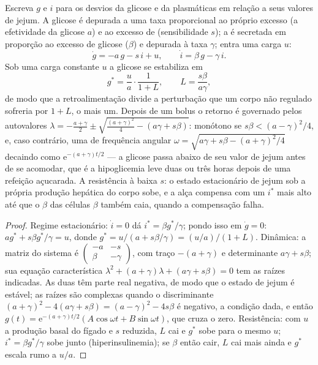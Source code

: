 \begin{theorem}\label{thm:b3:endocrinology:loop}
Escreva $g$ e $i$ para os desvios da glicose e da  plasmáticas
em relação a seus valores de jejum. A glicose é depurada a uma taxa
proporcional ao próprio excesso (a efetividade da glicose $a$) e ao
excesso de  (sensibilidade $s$); a  é secretada em
proporção ao excesso de glicose ($\beta$) e depurada à taxa $\gamma$;
entra uma carga $u$:
\[
\dot g = -a\,g - s\,i + u, \qquad \dot i = \beta\,g - \gamma\,i .
\]
Sob uma carga constante $u$ a glicose se estabiliza em
\[
g^{*} = \frac{u}{a}\cdot\frac{1}{1 + L}, \qquad L = \frac{s\beta}{a\gamma},
\]
de modo que a retroalimentação divide a perturbação que um corpo não
regulado sofreria por $1 + L$, o \emph{} mais um. Depois de
um bolus o retorno é governado pelos autovalores
$\lambda = -\tfrac{a + \gamma}{2} \pm \sqrt{\tfrac{(a+\gamma)^{2}}{4} - (a\gamma + s\beta)}$:
monótono se $s\beta < (a - \gamma)^{2}/4$, e, caso contrário, uma
 de frequência angular $\omega = \sqrt{a\gamma + s\beta -
(a+\gamma)^{2}/4}$ decaindo como $\mathrm{e}^{-(a+\gamma)t/2}$
--- a glicose passa abaixo de seu valor de jejum antes de se acomodar,
que é a hipoglicemia leve duas ou três horas depois de uma refeição
açucarada. A resistência à  baixa $s$: o estado estacionário de
jejum sob a própria produção hepática do corpo sobe, e a alça compensa
com um $i^{*}$ mais alto até que o $\beta$ das células $\beta$ também
caia, quando a compensação falha.
\end{theorem}
\begin{proof}
Regime estacionário: $\dot i = 0$ dá $i^{*} = \beta g^{*}/\gamma$; pondo
isso em $\dot g = 0$: $a g^{*} + s\beta g^{*}/\gamma = u$, donde $g^{*} =
u/(a + s\beta/\gamma) = (u/a)/(1 + L)$. Dinâmica: a matriz do sistema é
$\begin{pmatrix} -a & -s\\ \beta & -\gamma\end{pmatrix}$, com traço
$-(a+\gamma)$ e determinante $a\gamma + s\beta$; sua equação
característica $\lambda^{2} + (a+\gamma)\lambda + (a\gamma + s\beta) = 0$
tem as raízes indicadas. As duas têm parte real negativa, de modo que o
estado de jejum é estável; as raízes são complexas quando o
discriminante $(a+\gamma)^{2}
- 4(a\gamma + s\beta) = (a-\gamma)^{2} - 4s\beta$ é negativo, a condição dada, e então $g(t) = \mathrm{e}^{-(a+\gamma)t/2}(A\cos\omega t
+ B\sin\omega t)$, que cruza o
zero. Resistência: com $u$ a produção basal do fígado e $s$ reduzida, $L$
cai e $g^{*}$ sobe para o mesmo $u$; $i^{*} = \beta g^{*}/\gamma$ sobe
junto (hiperinsulinemia); se $\beta$ então cair, $L$ cai mais ainda e
$g^{*}$ escala rumo a $u/a$.
\end{proof}

